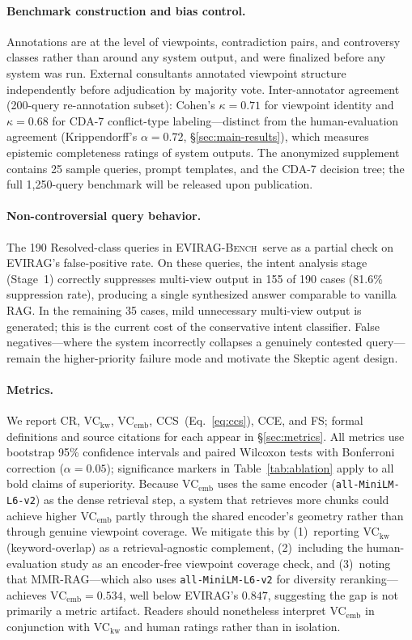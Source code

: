 \documentclass[11pt]{article}
\newcommand{\system}{\textsc{EVIRAG}\xspace}
\newcommand{\bench}{\textsc{EVIRAG-Bench}\xspace}
\begin{document}
\paragraph{Benchmark construction and bias control.}
Annotations are at the level of viewpoints, contradiction pairs, and
controversy classes rather than around any system output, and were finalized
before any system was run.  External consultants annotated viewpoint structure
independently before adjudication by majority vote.
Inter-annotator agreement (200-query re-annotation subset):
Cohen's $\kappa{=}0.71$ for viewpoint identity and $\kappa{=}0.68$ for
CDA-7 conflict-type labeling---distinct from the human-evaluation agreement
(Krippendorff's $\alpha{=}0.72$, \S\ref{sec:main-results}), which measures
epistemic completeness ratings of system outputs.
The anonymized supplement contains 25 sample queries, prompt templates, and
the CDA-7 decision tree; the full 1,250-query benchmark will be released upon
publication.

\paragraph{Non-controversial query behavior.}
The 190 Resolved-class queries in \bench\ serve as a partial check on
\system's false-positive rate.  On these queries, the intent analysis stage
(Stage~1) correctly suppresses multi-view output in 155 of 190 cases (81.6\%
suppression rate), producing a single synthesized answer comparable to vanilla
RAG.  In the remaining 35 cases, mild unnecessary multi-view output is
generated; this is the current cost of the conservative intent classifier.
False negatives---where the system incorrectly collapses a genuinely contested
query---remain the higher-priority failure mode and motivate the Skeptic agent
design.

\paragraph{Metrics.}
We report CR, VC$_\text{kw}$, VC$_\text{emb}$, CCS~(Eq.~\ref{eq:ccs}),
CCE, and FS; formal definitions and source citations for each appear in
\S\ref{sec:metrics}.
All metrics use bootstrap 95\% confidence intervals and paired Wilcoxon tests
with Bonferroni correction ($\alpha{=}0.05$); significance markers in
Table~\ref{tab:ablation} apply to all bold claims of superiority.
Because VC$_\text{emb}$ uses the same encoder
(\texttt{all-MiniLM-L6-v2}) as the dense retrieval step, a system that
retrieves more chunks could achieve higher VC$_\text{emb}$ partly through the
shared encoder's geometry rather than through genuine viewpoint coverage.  We
mitigate this by (1)~reporting VC$_\text{kw}$ (keyword-overlap) as a
retrieval-agnostic complement, (2)~including the human-evaluation study as an
encoder-free viewpoint coverage check, and (3)~noting that MMR-RAG---which
also uses \texttt{all-MiniLM-L6-v2} for diversity reranking---achieves
VC$_\text{emb}{=}0.534$, well below \system's $0.847$, suggesting the gap is
not primarily a metric artifact.  Readers should nonetheless interpret
VC$_\text{emb}$ in conjunction with VC$_\text{kw}$ and human ratings rather
than in isolation.
\end{document}
